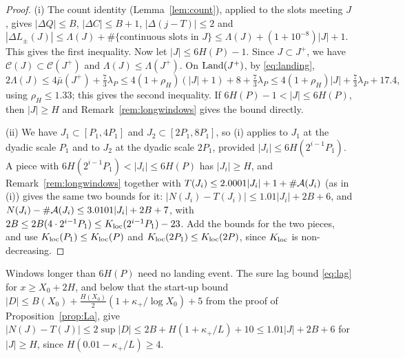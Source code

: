 \begin{proof}
(i) The count identity (Lemma~\ref{lem:count}), applied to the slots meeting $J$, gives $|\Delta Q|\le B$, $|\Delta C|\le B+1$,
$|\Delta(j-T)|\le2$ and $|\Delta L_\pm(J)|\le\Lambda(J)+\#\{\text{continuous slots in }J\}\le\Lambda(J)+(1+10^{-8})|J|+1$. This gives the first
inequality. Now let $|J|\le6H(P)-1$. Since $J\subset J^+$, we have $\mathcal C(J)\subset\mathcal C(J^+)$ and
$\Lambda(J)\le\Lambda(J^+)$. On $\mathrm{Land}(J^+)$, by \eqref{eq:landing},
\[
2\Lambda(J)\le4\bar\mu(J^+)+\tfrac73\lambda_P\le4(1+\rho_H)(|J|+1)+8+\tfrac73\lambda_P\le4(1+\rho_H)|J|+\tfrac73\lambda_P+17.4,
\]
using $\rho_H\le1.33$; this gives the second inequality. If $6H(P)-1<|J|\le6H(P)$, then $|J|\ge H$ and Remark~\ref{rem:longwindows}
gives the bound directly.

(ii) We have $J_1\subset[P_1,4P_1]$ and $J_2\subset[2P_1,8P_1]$, so (i) applies to $J_1$ at the dyadic scale $P_1$ and to
$J_2$ at the dyadic scale $2P_1$, provided $|J_i|\le6H(2^{i-1}P_1)$. A piece with $6H(2^{i-1}P_1)<|J_i|\le6H(P)$ has
$|J_i|\ge H$, and Remark~\ref{rem:longwindows} together with $T(J_i)\le2.0001|J_i|+1+\#\mathcal{A}(J_i)$ (as in (i)) gives the same
two bounds for it: $|N(J_i)-T(J_i)|\le1.01|J_i|+2B+6$, and $N(J_i)-\#\mathcal{A}(J_i)\le3.0101|J_i|+2B+7$, with
$2B\le2B(4\cdot2^{i-1}P_1)\le K_{\mathrm{loc}}(2^{i-1}P_1)-23$.
Add the bounds for the two pieces, and use $K_{\mathrm{loc}}(P_1)\le K_{\mathrm{loc}}(P)$ and $K_{\mathrm{loc}}(2P_1)\le K_{\mathrm{loc}}(2P)$, since $K_{\mathrm{loc}}$ is
non-decreasing.
\end{proof}

\begin{remark}\label{rem:longwindows}
Windows longer than $6H(P)$ need no landing event. The sure lag bound \eqref{eq:lag} for $x\ge X_0+2H$, and below that
the start-up bound $|D|\le B(X_0)+\frac{H(X_0)}2(1+\kappa_+/\log X_0)+5$ from the proof of Proposition~\ref{prop:La}, give
$|N(J)-T(J)|\le2\sup|D|\le2B+H(1+\kappa_+/L)+10\le1.01|J|+2B+6$ for $|J|\ge H$, since $H(0.01-\kappa_+/L)\ge4$.
\end{remark}

